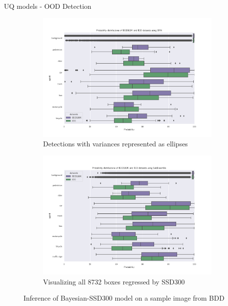 \documentclass[10pt, aspectratio=169]{beamer}
\begin{document}
\begin{frame}[allowframebreaks]{UQ models - OOD Detection}
    \begin{figure}[H]
        \captionsetup[table]{skip=0pt}
            \centering
            \begin{subfigure}[t]{0.495\textwidth}
                \centering
                \includegraphics[width=\textwidth]{images/distributions/BNN_bdd_vs_iid_probabilities.png}
                \caption{Detections with variances represented as ellipses}
            \end{subfigure}
            \begin{subfigure}[t]{0.495\textwidth}
                \centering
                \includegraphics[width=\textwidth]{images/distributions/SubEns_bdd_vs_iid_probabilities.png}
                \caption{Visualizing all 8732 boxes regressed by SSD300}
            \end{subfigure}
            \caption{Inference of Bayesian-SSD300 model on a sample image from BDD}
    \end{figure}


\end{frame}
\end{document}
